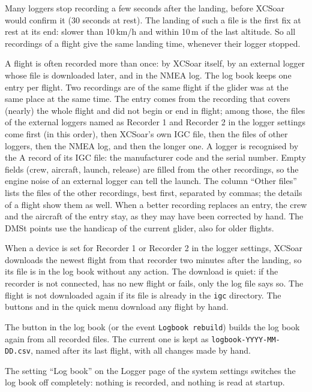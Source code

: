 Many loggers stop recording a few seconds after the landing, before
XCSoar would confirm it (30 seconds at rest).  The landing of such a
file is the first fix at rest at its end: slower than 10\,km/h and
within 10\,m of the last altitude.  So all recordings of a flight give
the same landing time, whenever their logger stopped.

A flight is often recorded more than once: by XCSoar itself, by an
external logger whose file is downloaded later, and in the NMEA log.
The log book keeps one entry per flight.  Two recordings are of the
same flight if the glider was at the same place at the same time.  The
entry comes from the recording that covers (nearly) the whole flight
and did not begin or end in flight; among those, the files of the
external loggers named as Recorder 1 and Recorder 2 in the logger
settings come first (in this order), then XCSoar's own IGC file, then
the files of other loggers, then the NMEA log, and then the longer
one.  A logger is recognised by the A record of its IGC file: the
manufacturer code and the serial number.  Empty fields (crew, aircraft, launch, release)
are filled from the other recordings, so the engine noise of an
external logger can tell the launch.  The column ``Other files'' lists
the files of the other recordings, best first, separated by commas;
the details of a flight show them as well.  When a better recording replaces
an entry, the crew and the aircraft of the entry stay, as they may have
been corrected by hand.  The DMSt points use the handicap of the
current glider, also for older flights.

When a device is set for Recorder 1 or Recorder 2 in the logger
settings, XCSoar downloads the newest flight from that recorder two
minutes after the landing, so its file is in the log book without any
action.  The download is quiet: if the recorder is not connected, has
no new flight or fails, only the log file says so.  The flight is not
downloaded again if its file is already in the \texttt{igc} directory.
The buttons  and  in the quick menu download any flight by hand.

The button  in the log book (or the event
\verb|Logbook rebuild|) builds the log book again from all recorded
files.  The current one is kept as \verb|logbook-YYYY-MM-DD.csv|,
named after its last flight, with all changes made by hand.

The setting ``Log book'' on the Logger page of the system settings
switches the log book off completely: nothing is recorded, and nothing
is read at startup.

